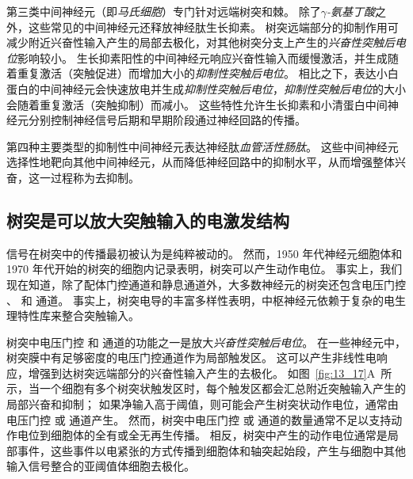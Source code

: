 第三类中间神经元（即\textit{马氏细胞}）专门针对远端树突和棘。
除了\textit{$\gamma$-氨基丁酸}之外，这些常见的中间神经元还释放神经肽生长抑素。
树突远端部分的抑制作用可减少附近兴奋性输入产生的局部去极化，对其他树突分支上产生的\textit{兴奋性突触后电位}影响较小。
生长抑素阳性的中间神经元响应兴奋性输入而缓慢激活，并生成随着重复激活（突触促进）而增加大小的\textit{抑制性突触后电位}。 
相比之下，表达小白蛋白的中间神经元会快速放电并生成\textit{抑制性突触后电位}，\textit{抑制性突触后电位}的大小会随着重复激活（突触抑制）而减小。
这些特性允许生长抑素和小清蛋白中间神经元分别控制神经信号后期和早期阶段通过神经回路的传播。


第四种主要类型的抑制性中间神经元表达神经肽\textit{血管活性肠肽}。
这些中间神经元选择性地靶向其他中间神经元，从而降低神经回路中的抑制水平，从而增强整体兴奋，这一过程称为去抑制。



\subsection{树突是可以放大突触输入的电激发结构}

信号在树突中的传播最初被认为是纯粹被动的。
然而，1950 年代神经元细胞体和 1970 年代开始的树突的细胞内记录表明，树突可以产生动作电位。
事实上，我们现在知道，除了配体门控通道和静息通道外，大多数神经元的树突还包含电压门控 、 和  通道。
事实上，树突电导的丰富多样性表明，中枢神经元依赖于复杂的电生理特性库来整合突触输入。


树突中电压门控  和  通道的功能之一是放大\textit{兴奋性突触后电位}。
在一些神经元中，树突膜中有足够密度的电压门控通道作为局部触发区。
这可以产生非线性电响应，增强到达树突远端部分的兴奋性输入产生的去极化。
如图~\ref{fig:13_17}A~所示，当一个细胞有多个树突状触发区时，每个触发区都会汇总附近突触输入产生的局部兴奋和抑制；
如果净输入高于阈值，则可能会产生树突状动作电位，通常由电压门控  或  通道产生。
然而，树突中电压门控  或  通道的数量通常不足以支持动作电位到细胞体的全有或全无再生传播。
相反，树突中产生的动作电位通常是局部事件，这些事件以电紧张的方式传播到细胞体和轴突起始段，产生与细胞中其他输入信号整合的亚阈值体细胞去极化。


